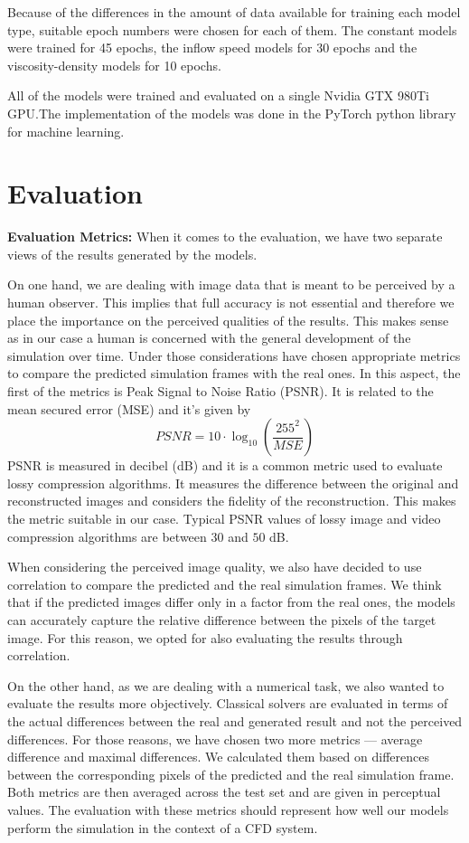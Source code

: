 \documentclass{llncs}
\begin{document}
Because of the differences in the amount of data available for training each model type, suitable epoch numbers were chosen for each of them. The constant models were trained for 45 epochs, the inflow speed models for 30 epochs and the viscosity-density models for 10 epochs.

All of the models were trained and evaluated on a single Nvidia GTX 980Ti GPU.\@ The implementation of the models was done in the PyTorch python library for machine learning.

\section{Evaluation}\label{eval}
\noindent\textbf{Evaluation Metrics:} When it comes to the evaluation, we have two separate views of the results generated by the models.

On one hand, we are dealing with image data that is meant to be perceived by a human observer. This implies that full accuracy is not essential and therefore we place the importance on the perceived qualities of the results. This makes sense as in our case a human is concerned with the general development of the simulation over time. Under those considerations have chosen appropriate metrics to compare the predicted simulation frames with the real ones. In this aspect, the first of the metrics is Peak Signal to Noise Ratio (PSNR). It is related to the mean secured error (MSE) and it's given by
\begin{equation}
PSNR = 10 \cdot \log_{10}\left(\frac{255^2}{MSE}\right)
\end{equation}
PSNR is measured in decibel (dB) and it is a common metric used to evaluate lossy compression algorithms. It measures the difference between the original and reconstructed images and considers the fidelity of the reconstruction. This makes the metric suitable in our case. Typical PSNR values of lossy image and video compression algorithms are between $30$ and $50$ dB.

When considering the perceived image quality, we also have decided to use correlation to compare the predicted and the real simulation frames. We think that if the predicted images differ only in a factor from the real ones, the models can accurately capture the relative difference between the pixels of the target image. For this reason, we opted for also evaluating the results through correlation.

On the other hand, as we are dealing with a numerical task, we also wanted to evaluate the results more objectively. Classical solvers are evaluated in terms of the actual differences between the real and generated result and not the perceived differences. For those reasons, we have chosen two more metrics --- average difference and maximal differences. We calculated them based on differences between the corresponding pixels of the predicted and the real simulation frame. Both metrics are then averaged across the test set and are given in perceptual values. The evaluation with these metrics should represent how well our models perform the simulation in the context of a CFD system.
\end{document}

